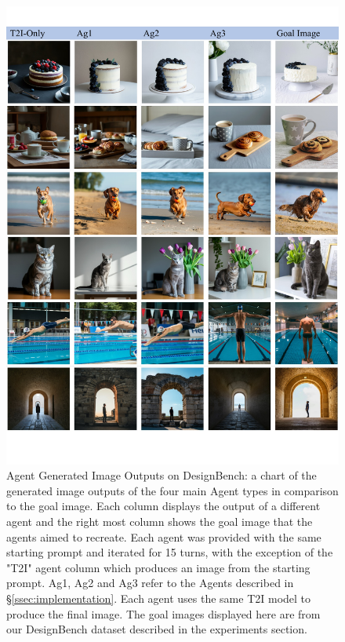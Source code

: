 \begin{figure}
    \centering
    \includegraphics[width=\linewidth]{figures/toy_data_chart_part1.pdf}
    \caption{Agent Generated Image Outputs on DesignBench: a chart of the generated image outputs of the four main Agent types in comparison to the goal image. Each column displays the output of a different agent and the right most column shows the goal image that the agents aimed to recreate. Each agent was provided with the same starting prompt and iterated for 15 turns, with the exception of the "T2I" agent column which produces an image from the starting prompt. Ag1, Ag2 and Ag3 refer to the Agents described in \S\ref{ssec:implementation}. Each agent uses the same T2I model to produce the final image. The goal images displayed here are from our DesignBench dataset described in the experiments section.}
    \label{fig:toy1}
\end{figure}

